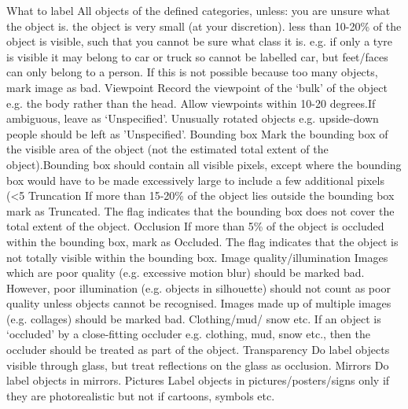 \begin{outline}
    \1 What to label
       \2 All objects of the defined categories, unless:
        \3 you are unsure what the object is.
        \3 the object is very small (at your discretion).
        \3 less than 10-20\% of the object is visible, such that you cannot be sure what class it is. e.g. if only a tyre is visible it may belong to car or truck so cannot be labelled car, but feet/faces can only belong to a person.
      \2If this is not possible because too many objects, mark image as bad.
    \1 Viewpoint
       \2 Record the viewpoint of the ‘bulk’ of the object e.g. the body rather than the head.  Allow viewpoints within 10-20 degrees.If ambiguous, leave as ‘Unspecified’. Unusually rotated objects e.g. upside-down people should be left as 'Unspecified'.
    \1 Bounding box
       \2 Mark the bounding box of the visible area of the object (not the estimated total extent of the object).Bounding box should contain all visible pixels, except where the bounding box would have to be made excessively large to include a few additional pixels (<5%
    \1 Truncation
       \2 If more than 15-20\% of the object lies outside the bounding box mark as Truncated. The flag indicates that the bounding box does not cover the total extent of the object.
    \1 Occlusion
       \2If more than 5\% of the object is occluded within the bounding box, mark as Occluded. The flag indicates that the object is not totally visible within the bounding box.
    \1 Image quality/illumination
       \2 Images which are poor quality (e.g. excessive motion blur) should be marked bad.  However, poor illumination (e.g. objects in silhouette) should not count as poor quality unless objects cannot be recognised. Images made up of multiple images (e.g. collages) should be marked bad.
    \1 Clothing/mud/ snow etc.
       \2 If an object is ‘occluded’ by a close-fitting occluder e.g. clothing, mud, snow etc., then the occluder should be treated as part of the object.
    \1 Transparency
       \2 Do label objects visible through glass, but treat reflections on the glass as occlusion.
    \1 Mirrors
       \2 Do label objects in mirrors.
    \1 Pictures
       \2 Label objects in pictures/posters/signs only if they are photorealistic but not if cartoons, symbols etc.
\end{outline}

